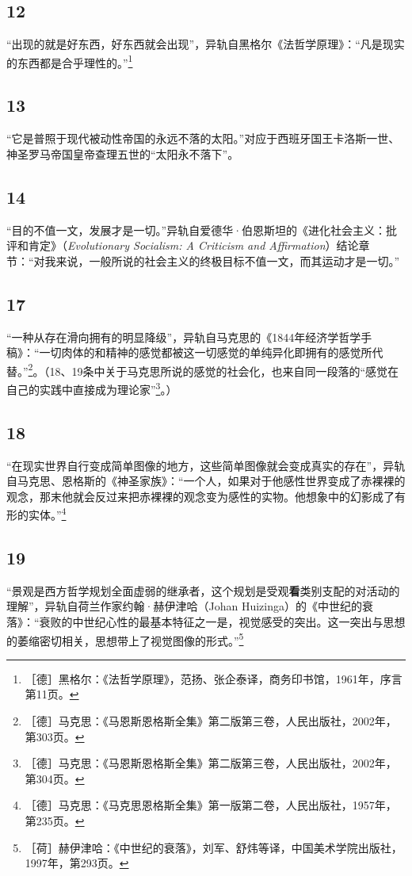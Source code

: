 \documentclass[fontset=fandol, a4paper, 12pt, openright]{ctexbook}
\begin{document}
\subsection*{12}
“出现的就是好东西，好东西就会出现”，异轨自黑格尔《法哲学原理》：“凡是现实的东西都是合乎理性的。”\footnote{［德］黑格尔：《法哲学原理》，范扬、张企泰译，商务印书馆，1961年，序言第11页。}

\subsection*{13}
“它是普照于现代被动性帝国的永远不落的太阳。”对应于西班牙国王卡洛斯一世、神圣罗马帝国皇帝查理五世的“太阳永不落下”。

\subsection*{14}
“目的不值一文，发展才是一切。”异轨自爱德华·伯恩斯坦的《进化社会主义：批评和肯定》（\textit{Evolutionary Socialism: A Criticism and Affirmation}）结论章节：“对我来说，一般所说的社会主义的终极目标不值一文，而其运动才是一切。”

\subsection*{17}
“一种从存在滑向拥有的明显降级”，异轨自马克思的《1844年经济学哲学手稿》：“一切肉体的和精神的感觉都被这一切感觉的单纯异化即拥有的感觉所代替。”\footnote{［德］马克思：《马恩斯恩格斯全集》第二版第三卷，人民出版社，2002年，第303页。}。（18、19条中关于马克思所说的感觉的社会化，也来自同一段落的“感觉在自己的实践中直接成为理论家”\footnote{［德］马克思：《马恩斯恩格斯全集》第二版第三卷，人民出版社，2002年，第304页。}。）

\subsection*{18}
“在现实世界自行变成简单图像的地方，这些简单图像就会变成真实的存在”，异轨自马克思、恩格斯的《神圣家族》：“一个人，如果对于他感性世界变成了赤裸裸的观念，那末他就会反过来把赤裸裸的观念变为感性的实物。他想象中的幻影成了有形的实体。”\footnote{［德］马克思：《马克思恩格斯全集》第一版第二卷，人民出版社，1957年，第235页。}

\subsection*{19}
“景观是西方哲学规划全面虚弱的继承者，这个规划是受观\textbf{看}类别支配的对活动的理解”，异轨自荷兰作家约翰·赫伊津哈（Johan Huizinga）的《中世纪的衰落》：“衰败的中世纪心性的最基本特征之一是，视觉感受的突出。这一突出与思想的萎缩密切相关，思想带上了视觉图像的形式。”\footnote{［荷］赫伊津哈：《中世纪的衰落》，刘军、舒炜等译，中国美术学院出版社，1997年，第293页。}
\end{document}
